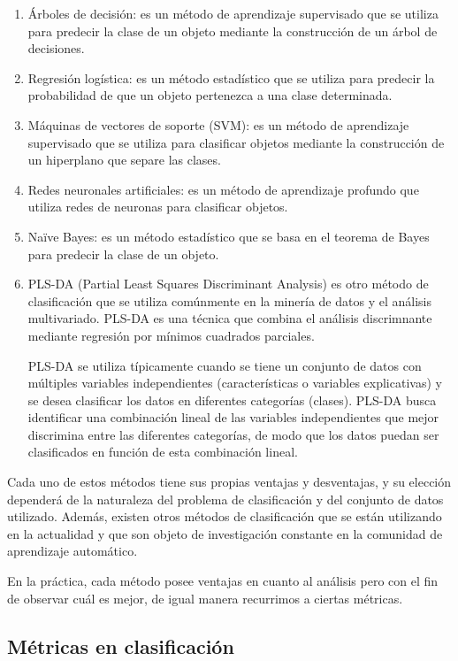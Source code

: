 \documentclass[
  letterpaper,
  DIV=11,
  numbers=noendperiod]{scrartcl}
\begin{document}
\begin{enumerate}
\def\labelenumi{\arabic{enumi}.}
\item
  Árboles de decisión: es un método de aprendizaje supervisado que se
  utiliza para predecir la clase de un objeto mediante la construcción
  de un árbol de decisiones.
\item
  Regresión logística: es un método estadístico que se utiliza para
  predecir la probabilidad de que un objeto pertenezca a una clase
  determinada.
\item
  Máquinas de vectores de soporte (SVM): es un método de aprendizaje
  supervisado que se utiliza para clasificar objetos mediante la
  construcción de un hiperplano que separe las clases.
\item
  Redes neuronales artificiales: es un método de aprendizaje profundo
  que utiliza redes de neuronas para clasificar objetos.
\item
  Naïve Bayes: es un método estadístico que se basa en el teorema de
  Bayes para predecir la clase de un objeto.
\item
  PLS-DA (Partial Least Squares Discriminant Analysis) es otro método de
  clasificación que se utiliza comúnmente en la minería de datos y el
  análisis multivariado. PLS-DA es una técnica que combina el análisis
  discrimnante mediante regresión por mínimos cuadrados parciales.

  PLS-DA se utiliza típicamente cuando se tiene un conjunto de datos con
  múltiples variables independientes (características o variables
  explicativas) y se desea clasificar los datos en diferentes categorías
  (clases). PLS-DA busca identificar una combinación lineal de las
  variables independientes que mejor discrimina entre las diferentes
  categorías, de modo que los datos puedan ser clasificados en función
  de esta combinación lineal.
\end{enumerate}

Cada uno de estos métodos tiene sus propias ventajas y desventajas, y su
elección dependerá de la naturaleza del problema de clasificación y del
conjunto de datos utilizado. Además, existen otros métodos de
clasificación que se están utilizando en la actualidad y que son objeto
de investigación constante en la comunidad de aprendizaje automático.

En la práctica, cada método posee ventajas en cuanto al análisis pero
con el fin de observar cuál es mejor, de igual manera recurrimos a
ciertas métricas.

\hypertarget{muxe9tricas-en-clasificaciuxf3n}{%
\subsection{Métricas en
clasificación}\label{muxe9tricas-en-clasificaciuxf3n}}
\end{document}
